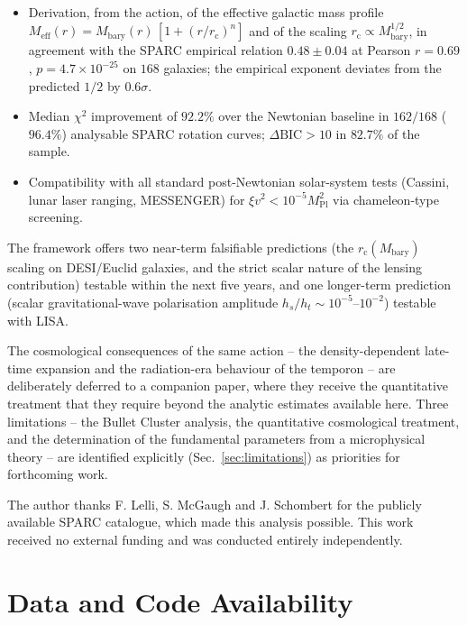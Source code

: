 \documentclass[%
    aps,
    prd,
    reprint,
    superscriptaddress,
    nofootinbib,
    floatfix,
    amsmath,amssymb,
]{revtex4-2}
\newcommand{\Meff}{M_{\mathrm{eff}}}
\newcommand{\Mbary}{M_{\mathrm{bary}}}
\newcommand{\rc}{r_{\mathrm{c}}}
\newcommand{\MPl}{M_{\mathrm{Pl}}}
\begin{document}
\begin{itemize}
\item Derivation, from the action, of the effective galactic mass
profile $\Meff(r) = \Mbary(r)\,[1+(r/\rc)^{n}]$ and of the
scaling $\rc\propto\Mbary^{1/2}$, in agreement with the
SPARC empirical relation $0.48\pm 0.04$ at Pearson
$r=0.69$, $p=4.7\times 10^{-25}$ on $168$ galaxies; the
empirical exponent deviates from the predicted $1/2$ by
$0.6\sigma$.
\item Median $\chi^{2}$ improvement of $92.2\%$ over the
Newtonian baseline in $162/168$ ($96.4\%$) analysable SPARC
rotation curves; $\Delta\mathrm{BIC}>10$ in $82.7\%$ of the
sample.
\item Compatibility with all standard post-Newtonian
solar-system tests (Cassini, lunar laser ranging, MESSENGER)
for $\xi v^{2}<10^{-5}\MPl^{2}$ via chameleon-type screening.
\end{itemize}

The framework offers two near-term falsifiable predictions (the
$\rc(\Mbary)$ scaling on DESI/Euclid galaxies, and the strict
scalar nature of the lensing contribution) testable within the
next five years, and one longer-term prediction (scalar
gravitational-wave polarisation amplitude
$h_{s}/h_{t}\sim 10^{-5}$--$10^{-2}$) testable with LISA.

The cosmological consequences of the same action -- the
density-dependent late-time expansion and the radiation-era
behaviour of the temporon -- are deliberately deferred to a
companion paper, where they receive the quantitative treatment
that they require beyond the analytic estimates available here.
Three limitations -- the Bullet Cluster analysis, the
quantitative cosmological treatment, and the determination of
the fundamental parameters from a microphysical theory -- are
identified explicitly (Sec.~\ref{sec:limitations}) as priorities
for forthcoming work.

\begin{acknowledgments}
The author thanks F. Lelli, S. McGaugh and J. Schombert for the
publicly available SPARC catalogue, which made this analysis
possible. This work received no external funding and was
conducted entirely independently.
\end{acknowledgments}

\section*{Data and Code Availability}
\end{document}
